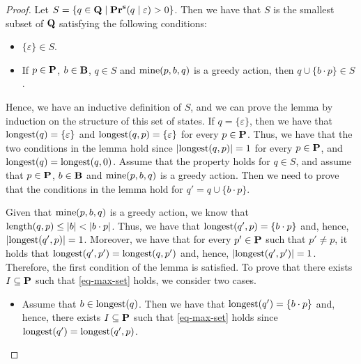 \begin{proof}
Let $S = \{ q \in \mathbf{Q} \mid \mathbf{Pr}^{\mathbf{s}}(q \mid \varepsilon) > 0 \}$. Then we have that $S$ is the smallest subset of $\mathbf{Q}$ satisfying the following conditions:
\begin{itemize}
\item $\{\varepsilon\} \in S$.

\item If $p \in \mathbf{P}$, $b \in \mathbf{B}$, $q \in S$ and $\text{\rm mine}(p,b,q)$ is a greedy action, then $q \cup \{ b \cdot p\} \in S$.
\end{itemize}
Hence, we have an inductive definition of $S$, and we can prove the lemma by induction on the structure of this set of states. If $q = \{ \varepsilon \}$, then we have that ${\text{\rm longest}}(q) = \{ \varepsilon \}$ and ${\text{\rm longest}}(q,p) = \{ \varepsilon \}$ for every $p \in \mathbf{P}$. Thus, we have that  the two conditions in the lemma hold since $|{\text{\rm longest}}(q,p)| = 1$ for every $p \in \mathbf{P}$, and ${\text{\rm longest}}(q) = {\text{\rm longest}}(q,0)$. Assume that the property holds for $q \in S$, and assume that $p \in \mathbf{P}$, $b \in \mathbf{B}$ and $\text{\rm mine}(p,b,q)$ is a greedy action. Then we need to prove that the conditions in the lemma hold for $q ' = q \cup \{b \cdot p \}$.

Given that $\text{\rm mine}(p,b,q)$ is a greedy action, we know that $\text{\rm length}(q,p) \leq |b| < |b \cdot p|$. Thus, we have that ${\text{\rm longest}}(q',p) = \{b \cdot p\}$ and, hence, $|{\text{\rm longest}}(q',p)| = 1$. Moreover, we have that for every $p' \in \mathbf{P}$ such that $p' \neq p$, it holds that ${\text{\rm longest}}(q',p') = {\text{\rm longest}}(q,p')$ and, hence, $|{\text{\rm longest}}(q',p')| = 1$. Therefore, the first condition of the lemma is satisfied. To prove that there exists $I \subseteq \mathbf{P}$ such that \eqref{eq-max-set} holds, we consider two cases.
\begin{itemize}
\item Assume that $b \in {\text{\rm longest}}(q)$. Then we have that ${\text{\rm longest}}(q') = \{ b \cdot p \}$ and, hence, there exists $I \subseteq \mathbf{P}$ such that \eqref{eq-max-set} holds since ${\text{\rm longest}}(q') = {\text{\rm longest}}(q',p)$.


\end{itemize}
\end{proof}
